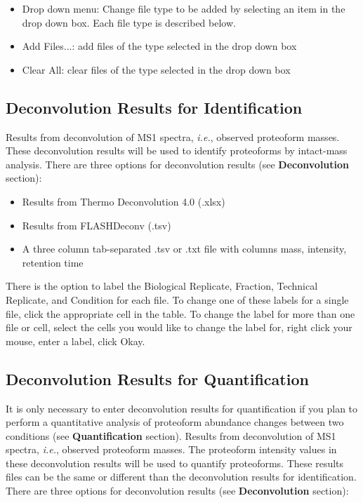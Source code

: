 \begin{itemize}
	\item Drop down menu: Change file type to be added by selecting an item in the drop down box. Each file type is described below. 
	\item Add Files...: add files of the type selected in the drop down box
	\item Clear All: clear files of the type selected in the drop down box
\end{itemize}
\pagebreak
\subsection{Deconvolution Results for Identification}

Results from deconvolution of MS1 spectra, \textit{i.e.}, observed proteoform masses. These deconvolution results will be used to identify proteoforms by intact-mass analysis. There are three options for deconvolution results (see \textbf{Deconvolution} section):

\begin{itemize}
	\item Results from Thermo Deconvolution 4.0 (.xlsx)
	\item Results from FLASHDeconv (.tsv)
	\item A three column tab-separated .tsv or .txt file with columns mass, intensity, retention time
\end{itemize}

There is the option to label the Biological Replicate, Fraction, Technical Replicate, and Condition for each file. To change one of these labels for a single file, click the appropriate cell in the table. To change the label for more than one file or cell, select the cells you would like to change the label for, right click your mouse, enter a label, click Okay. 

\subsection{Deconvolution Results for Quantification}

It is only necessary to enter deconvolution results for quantification if you plan to perform a quantitative analysis of proteoform abundance changes between two conditions (see \textbf{Quantification} section). Results from deconvolution of MS1 spectra, \textit{i.e.}, observed proteoform masses. The proteoform intensity values in these deconvolution results will be used to quantify proteoforms.\supercite{Cesnik2018,Schaffer2018} These results files can be the same or different than the deconvolution results for identification.  There are three options for deconvolution results (see \textbf{Deconvolution} section):

